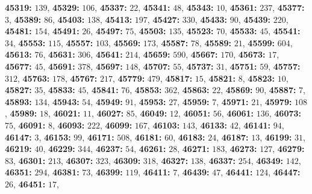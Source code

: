 \textsf{\bfseries 45319:} $139$, \textsf{\bfseries 45329:} $106$, \textsf{\bfseries 45337:} $22$, \textsf{\bfseries 45341:} $48$, \textsf{\bfseries 45343:} $10$, \textsf{\bfseries 45361:} $237$, \textsf{\bfseries 45377:} $3$, \textsf{\bfseries 45389:} $86$, \textsf{\bfseries 45403:} $138$, \textsf{\bfseries 45413:} $197$, \textsf{\bfseries 45427:} $330$, \textsf{\bfseries 45433:} $90$, \textsf{\bfseries 45439:} $220$, \textsf{\bfseries 45481:} $154$, \textsf{\bfseries 45491:} $26$, \textsf{\bfseries 45497:} $75$, \textsf{\bfseries 45503:} $135$, \textsf{\bfseries 45523:} $70$, \textsf{\bfseries 45533:} $45$, \textsf{\bfseries 45541:} $34$, \textsf{\bfseries 45553:} $115$, \textsf{\bfseries 45557:} $103$, \textsf{\bfseries 45569:} $173$, \textsf{\bfseries 45587:} $78$, \textsf{\bfseries 45589:} $21$, \textsf{\bfseries 45599:} $604$, \textsf{\bfseries 45613:} $76$, \textsf{\bfseries 45631:} $306$, \textsf{\bfseries 45641:} $214$, \textsf{\bfseries 45659:} $590$, \textsf{\bfseries 45667:} $170$, \textsf{\bfseries 45673:} $17$, \textsf{\bfseries 45677:} $45$, \textsf{\bfseries 45691:} $378$, \textsf{\bfseries 45697:} $148$, \textsf{\bfseries 45707:} $55$, \textsf{\bfseries 45737:} $31$, \textsf{\bfseries 45751:} $59$, \textsf{\bfseries 45757:} $312$, \textsf{\bfseries 45763:} $178$, \textsf{\bfseries 45767:} $217$, \textsf{\bfseries 45779:} $479$, \textsf{\bfseries 45817:} $15$, \textsf{\bfseries 45821:} $8$, \textsf{\bfseries 45823:} $10$, \textsf{\bfseries 45827:} $35$, \textsf{\bfseries 45833:} $45$, \textsf{\bfseries 45841:} $76$, \textsf{\bfseries 45853:} $362$, \textsf{\bfseries 45863:} $22$, \textsf{\bfseries 45869:} $90$, \textsf{\bfseries 45887:} $7$, \textsf{\bfseries 45893:} $134$, \textsf{\bfseries 45943:} $54$, \textsf{\bfseries 45949:} $91$, \textsf{\bfseries 45953:} $27$, \textsf{\bfseries 45959:} $7$, \textsf{\bfseries 45971:} $21$, \textsf{\bfseries 45979:} $108$, \textsf{\bfseries 45989:} $18$, \textsf{\bfseries 46021:} $11$, \textsf{\bfseries 46027:} $85$, \textsf{\bfseries 46049:} $12$, \textsf{\bfseries 46051:} $56$, \textsf{\bfseries 46061:} $136$, \textsf{\bfseries 46073:} $75$, \textsf{\bfseries 46091:} $8$, \textsf{\bfseries 46093:} $222$, \textsf{\bfseries 46099:} $167$, \textsf{\bfseries 46103:} $143$, \textsf{\bfseries 46133:} $42$, \textsf{\bfseries 46141:} $94$, \textsf{\bfseries 46147:} $3$, \textsf{\bfseries 46153:} $99$, \textsf{\bfseries 46171:} $508$, \textsf{\bfseries 46181:} $60$, \textsf{\bfseries 46183:} $24$, \textsf{\bfseries 46187:} $13$, \textsf{\bfseries 46199:} $31$, \textsf{\bfseries 46219:} $40$, \textsf{\bfseries 46229:} $344$, \textsf{\bfseries 46237:} $54$, \textsf{\bfseries 46261:} $28$, \textsf{\bfseries 46271:} $183$, \textsf{\bfseries 46273:} $127$, \textsf{\bfseries 46279:} $83$, \textsf{\bfseries 46301:} $213$, \textsf{\bfseries 46307:} $323$, \textsf{\bfseries 46309:} $318$, \textsf{\bfseries 46327:} $138$, \textsf{\bfseries 46337:} $254$, \textsf{\bfseries 46349:} $142$, \textsf{\bfseries 46351:} $294$, \textsf{\bfseries 46381:} $73$, \textsf{\bfseries 46399:} $119$, \textsf{\bfseries 46411:} $7$, \textsf{\bfseries 46439:} $47$, \textsf{\bfseries 46441:} $124$, \textsf{\bfseries 46447:} $26$, \textsf{\bfseries 46451:} $17$, 
